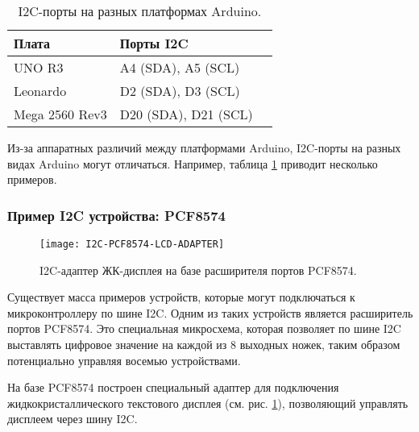 \documentclass[../sparc.tex]{subfiles}
\begin{document}
\begin{table}[h]
  \centering
  \begin{tabular}{ | m{5em} | m{1cm}| m{1cm} | }
    \hline
    Плата & Порты I2C \\
    \hline
    UNO R3 & A4 (SDA), A5 (SCL) \\
    \hline
    Leonardo & D2 (SDA), D3 (SCL) \\
    \hline
    Mega 2560 Rev3 & D20 (SDA), D21 (SCL) \\
    \hline
  \end{tabular}
  \caption{I2C-порты на разных платформах Arduino.}
  \label{table:i2c-pins}
\end{table}

Из-за аппаратных различий между платформами Arduino, I2C-порты на разных видах
Arduino могут отличаться. Например, таблица \ref{table:i2c-pins} приводит
несколько примеров.

\subsubsection{Пример I2C устройства: PCF8574}

\begin{figure}[H]
  \centering
  \texttt{[image: I2C-PCF8574-LCD-ADAPTER]}
  \caption{I2C-адаптер ЖК-дисплея на базе расширителя портов PCF8574.}
  \label{fig:i2c-pcf8574-lcd-adapter}
\end{figure}

Существует масса примеров устройств, которые могут подключаться к
микроконтроллеру по шине I2C.  Одним из таких устройств является расширитель
портов PCF8574.  Это специальная микросхема, которая позволяет по шине I2C
выставлять цифровое значение на каждой из 8 выходных ножек, таким образом
потенциально управляя восемью устройствами.

На базе PCF8574 построен специальный адаптер для подключения
жидкокристаллического текстового дисплея
(см. рис. \ref{fig:i2c-pcf8574-lcd-adapter}), позволяющий управлять дисплеем
через шину I2C.
\end{document}

